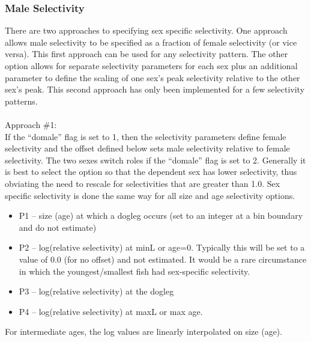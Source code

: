 \subsubsection{Male Selectivity}
There are two approaches to specifying sex specific selectivity.  One approach allows male selectivity to be specified as a fraction of female selectivity (or vice versa).  This first approach can be used for any selectivity pattern.  The other option allows for separate selectivity parameters for each sex plus an additional parameter to define the scaling of one sex’s peak selectivity relative to the other sex’s peak.  This second approach has only been implemented for a few selectivity patterns.\\
\\
Approach \#1:\\
If the “domale” flag is set to 1, then the selectivity parameters define female selectivity and the offset defined below sets male selectivity relative to female selectivity.  The two sexes switch roles if the “domale” flag is set to 2.  Generally it is best to select the option so that the dependent sex has lower selectivity, thus obviating the need to rescale for selectivities that are greater than 1.0.  Sex specific selectivity is done the same way for all size and age selectivity options.
\begin{itemize}
	\item P1 – size (age) at which a dogleg occurs (set to an integer at a bin boundary and do not estimate)
	\item P2 – log(relative selectivity) at minL or age=0.  Typically this will be set to a value of 0.0 (for no offset) and not estimated.  It would be a rare circumstance in which the youngest/smallest fish had sex-specific selectivity.
	\item P3 – log(relative selectivity) at the dogleg
	\item P4 – log(relative selectivity) at maxL or max age.
\end{itemize}

For intermediate ages, the log values are linearly interpolated on size (age).

